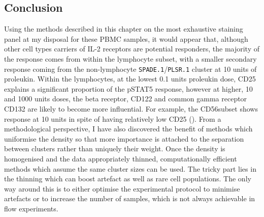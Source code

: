 \subsection{Conclusion}

Using the methods described in this chapter on the most exhaustive staining panel at my disposal for these \gls{PBMC} samples, it would appear that, although other cell types carriers of IL-2 receptors are potential responders, the majority of the response comes from within the lymphocyte subset, with a smaller secondary response coming from the non-lymphocyte \texttt{SPADE.1}/\texttt{PLSR.1} cluster at 10 units of proleukin.
Within the lymphocytes, at the lowest 0.1 units proleukin dose, CD25 explains a significant proportion of the pSTAT5 response, however at higher, 10 and 1000 units doses, the beta receptor, CD122 and common gamma receptor CD132 are likely to become more influential.
For example, the CD56\high subset
shows response at 10 units in spite of having relatively low CD25 ().
From a methodological perspective, I have also discovered the benefit of methods which uniformise the density so that more importance is attached to the separation between clusters rather than uniquely their weight.
Once the density is homogenised and the data appropriately thinned, computationally efficient methods which assume the same cluster sizes can be used.
The tricky part lies in the thinning which can boost artefact as well as rare cell populations.
The only way around this is to either optimise the experimental protocol to minimise artefacts or to increase the number of samples, which is not always achievable in flow experiments.






